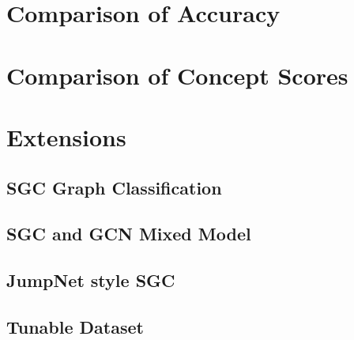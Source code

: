 \section{Comparison of Accuracy}

\section{Comparison of Concept Scores}

\section{Extensions}

\subsection{SGC Graph Classification}

\subsection{SGC and GCN Mixed Model}

\subsection{JumpNet style SGC}

\subsection{Tunable Dataset}
